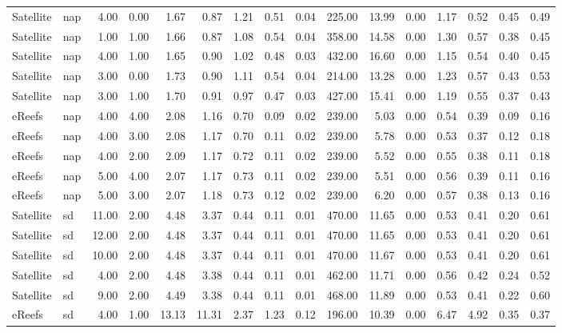 \begin{table}[ht]
\begin{tabular}{llrrrrrrrrrrrrrr}
   \midrule
Satellite & nap & 4.00 & 0.00 & 1.67 & 0.87 & 1.21 & 0.51 & 0.04 & 225.00 & 13.99 & 0.00 & 1.17 & 0.52 & 0.45 & 0.49 \\ 
  Satellite & nap & 1.00 & 1.00 & 1.66 & 0.87 & 1.08 & 0.54 & 0.04 & 358.00 & 14.58 & 0.00 & 1.30 & 0.57 & 0.38 & 0.45 \\ 
  Satellite & nap & 4.00 & 1.00 & 1.65 & 0.90 & 1.02 & 0.48 & 0.03 & 432.00 & 16.60 & 0.00 & 1.15 & 0.54 & 0.40 & 0.45 \\ 
  Satellite & nap & 3.00 & 0.00 & 1.73 & 0.90 & 1.11 & 0.54 & 0.04 & 214.00 & 13.28 & 0.00 & 1.23 & 0.57 & 0.43 & 0.53 \\ 
  Satellite & nap & 3.00 & 1.00 & 1.70 & 0.91 & 0.97 & 0.47 & 0.03 & 427.00 & 15.41 & 0.00 & 1.19 & 0.55 & 0.37 & 0.43 \\ 
  eReefs & nap & 4.00 & 4.00 & 2.08 & 1.16 & 0.70 & 0.09 & 0.02 & 239.00 & 5.03 & 0.00 & 0.54 & 0.39 & 0.09 & 0.16 \\ 
  eReefs & nap & 4.00 & 3.00 & 2.08 & 1.17 & 0.70 & 0.11 & 0.02 & 239.00 & 5.78 & 0.00 & 0.53 & 0.37 & 0.12 & 0.18 \\ 
  eReefs & nap & 4.00 & 2.00 & 2.09 & 1.17 & 0.72 & 0.11 & 0.02 & 239.00 & 5.52 & 0.00 & 0.55 & 0.38 & 0.11 & 0.18 \\ 
  eReefs & nap & 5.00 & 4.00 & 2.07 & 1.17 & 0.73 & 0.11 & 0.02 & 239.00 & 5.51 & 0.00 & 0.56 & 0.39 & 0.11 & 0.16 \\ 
  eReefs & nap & 5.00 & 3.00 & 2.07 & 1.18 & 0.73 & 0.12 & 0.02 & 239.00 & 6.20 & 0.00 & 0.57 & 0.38 & 0.13 & 0.16 \\ 
   \midrule
Satellite & sd & 11.00 & 2.00 & 4.48 & 3.37 & 0.44 & 0.11 & 0.01 & 470.00 & 11.65 & 0.00 & 0.53 & 0.41 & 0.20 & 0.61 \\ 
  Satellite & sd & 12.00 & 2.00 & 4.48 & 3.37 & 0.44 & 0.11 & 0.01 & 470.00 & 11.65 & 0.00 & 0.53 & 0.41 & 0.20 & 0.61 \\ 
  Satellite & sd & 10.00 & 2.00 & 4.48 & 3.37 & 0.44 & 0.11 & 0.01 & 470.00 & 11.67 & 0.00 & 0.53 & 0.41 & 0.20 & 0.61 \\ 
  Satellite & sd & 4.00 & 2.00 & 4.48 & 3.38 & 0.44 & 0.11 & 0.01 & 462.00 & 11.71 & 0.00 & 0.56 & 0.42 & 0.24 & 0.52 \\ 
  Satellite & sd & 9.00 & 2.00 & 4.49 & 3.38 & 0.44 & 0.11 & 0.01 & 468.00 & 11.89 & 0.00 & 0.53 & 0.41 & 0.22 & 0.60 \\ 
  eReefs & sd & 4.00 & 1.00 & 13.13 & 11.31 & 2.37 & 1.23 & 0.12 & 196.00 & 10.39 & 0.00 & 6.47 & 4.92 & 0.35 & 0.37 \\ 

\end{tabular}
\end{table}
